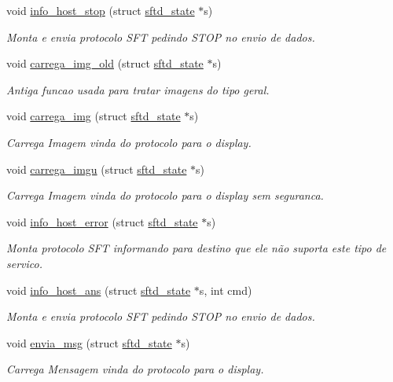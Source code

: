 \begin{DoxyCompactItemize}
void \hyperlink{group__SFTD_ga65321a4c9870ef49a16b3c2dd444276e}{info\_\-host\_\-stop} (struct \hyperlink{structsftd__state}{sftd\_\-state} $\ast$s)
\begin{DoxyCompactList}\small\item\em Monta e envia protocolo SFT pedindo STOP no envio de dados. \item\end{DoxyCompactList}\item 
void \hyperlink{group__SFTD_gaffb793b26caefd07873afa01ace4ee61}{carrega\_\-img\_\-old} (struct \hyperlink{structsftd__state}{sftd\_\-state} $\ast$s)
\begin{DoxyCompactList}\small\item\em Antiga funcao usada para tratar imagens do tipo geral. \item\end{DoxyCompactList}\item 
void \hyperlink{group__SFTD_gab0520adf98ea71f71de3d1f42c778fac}{carrega\_\-img} (struct \hyperlink{structsftd__state}{sftd\_\-state} $\ast$s)
\begin{DoxyCompactList}\small\item\em Carrega Imagem vinda do protocolo para o display. \item\end{DoxyCompactList}\item 
void \hyperlink{group__SFTD_ga7a80643708e17a7a7b3b7980ea3f901b}{carrega\_\-imgu} (struct \hyperlink{structsftd__state}{sftd\_\-state} $\ast$s)
\begin{DoxyCompactList}\small\item\em Carrega Imagem vinda do protocolo para o display sem seguranca. \item\end{DoxyCompactList}\item 
void \hyperlink{group__SFTD_gab65ca45c5d292fbf9a8be579f465697b}{info\_\-host\_\-error} (struct \hyperlink{structsftd__state}{sftd\_\-state} $\ast$s)
\begin{DoxyCompactList}\small\item\em Monta protocolo SFT informando para destino que ele não suporta este tipo de servico. \item\end{DoxyCompactList}\item 
void \hyperlink{group__SFTD_gabb1d77f4fcd81b5a3bd4022b62d7f7e0}{info\_\-host\_\-ans} (struct \hyperlink{structsftd__state}{sftd\_\-state} $\ast$s, int cmd)
\begin{DoxyCompactList}\small\item\em Monta e envia protocolo SFT pedindo STOP no envio de dados. \item\end{DoxyCompactList}\item 
void \hyperlink{group__SFTD_gabe069b166e0011721dbd75c84b64660e}{envia\_\-msg} (struct \hyperlink{structsftd__state}{sftd\_\-state} $\ast$s)
\begin{DoxyCompactList}\small\item\em Carrega Mensagem vinda do protocolo para o display. \item\end{DoxyCompactList}\end{DoxyCompactItemize}
